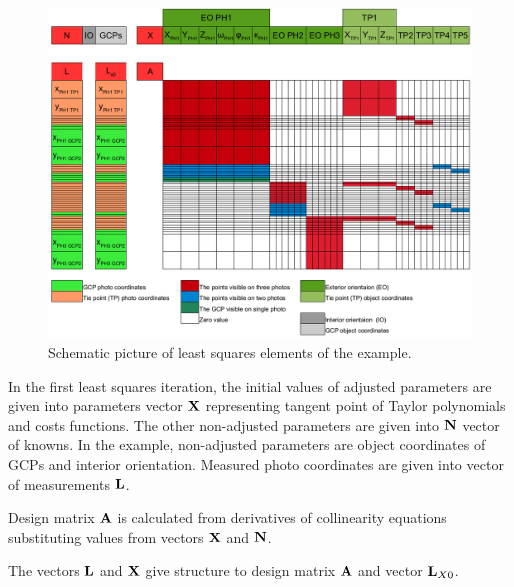 \documentclass[a4paper,12pt]{article}
\newcommand{\evect}[1]{%
{\bf #1}%
}
\begin{document}
\begin{figure}[h]
    \hspace*{-1.0in}
   \includegraphics[scale=0.47]{figures/bba_system.png}
    \caption{Schematic picture of least squares elements of the example.}
    \label{fig:bba_system}
\end{figure}


In the first least squares iteration, the initial values of adjusted parameters are given into parameters vector $\evect{X}$
 representing tangent point of Taylor polynomials and costs functions.  The other non-adjusted 
parameters are given into $\evect{N}$ vector of knowns. In the example, non-adjusted parameters are object coordinates
of GCPs and interior orientation. 
Measured photo coordinates are given
into vector of measurements $\evect{L}$.

Design matrix $\evect{A}$ is calculated from 
derivatives of collinearity equations substituting values from vectors $\evect{X}$ and $\evect{N}$.


The vectors  $\evect{L}$ and  $\evect{X}$ give structure to design matrix $\evect{A}$ and
vector $\evect{L}_{X0}$.
\end{document}
